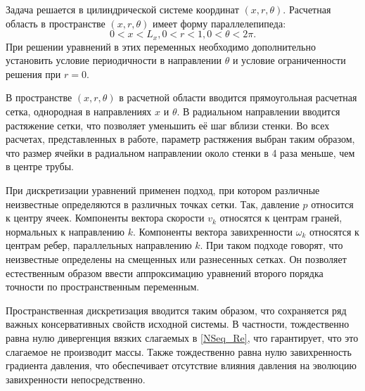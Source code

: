 Задача решается в цилиндрической системе координат $(x,r,\theta)$. Расчетная область в пространстве $(x,r,\theta)$ имеет форму параллелепипеда:
\begin{equation}
0 < x < L_x, 0 < r < 1, 0 < \theta < 2\pi.
\end{equation}
При решении уравнений в этих переменных необходимо дополнительно установить условие периодичности в направлении $\theta$ и условие ограниченности решения при $r=0$.

В пространстве $(x,r,\theta)$ в расчетной области вводится прямоугольная расчетная сетка, однородная в направлениях $x$ и $\theta$. В радиальном направлении вводится растяжение сетки, что позволяет уменьшить её шаг вблизи стенки. Во всех расчетах, представленных в работе, параметр растяжения выбран таким образом, что размер ячейки в радиальном направлении около стенки в 4 раза меньше, чем в центре трубы. 

При дискретизации уравнений применен подход, при котором различные неизвестные определяются в различных точках сетки. Так, давление $p$ относится к центру ячеек. Компоненты вектора скорости $v_k$ относятся к центрам граней, нормальных к направлению $k$. Компоненты вектора завихренности $\omega_k$ относятся к центрам ребер, параллельных направлению $k$. При таком подходе говорят, что неизвестные определены на смещенных или разнесенных сетках. Он позволяет естественным образом ввести аппроксимацию уравнений второго порядка точности по пространственным переменным.

Пространственная дискретизация вводится таким образом, что сохраняется ряд важных консервативных свойств исходной системы. В частности, тождественно равна нулю дивергенция вязких слагаемых в \eqref{NSeq_Re}, что гарантирует, что это слагаемое не производит массы. Также тождественно равна нулю завихренность градиента давления, что обеспечивает отсутствие влияния давления на эволюцию завихренности непосредственно. 

